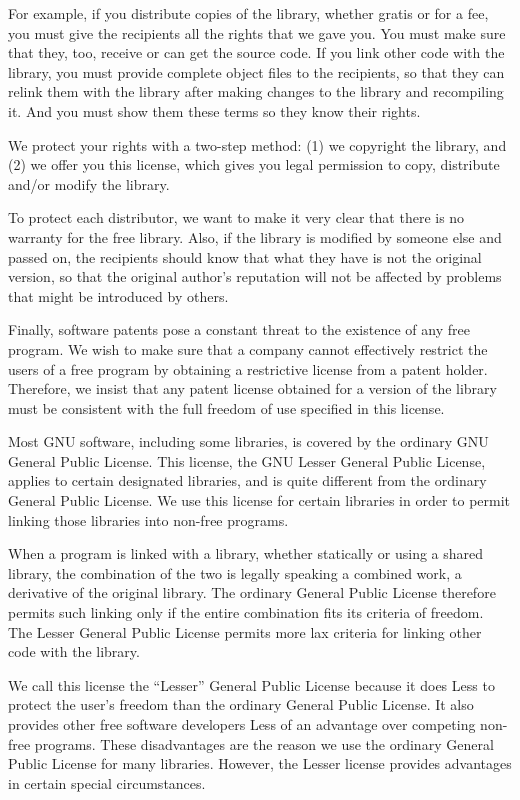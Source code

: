 \documentclass[12pt]{report}
\begin{document}
For example, if you distribute copies of the library, whether gratis or
for a fee, you must give the recipients all the rights that we gave you.
You must make sure that they, too, receive or can get the source code.  If
you link other code with the library, you must provide complete object
files to the recipients, so that they can relink them with the library
after making changes to the library and recompiling it.  And you must show
them these terms so they know their rights.

We protect your rights with a two-step method: (1) we copyright the
library, and (2) we offer you this license, which gives you legal
permission to copy, distribute and/or modify the library.

To protect each distributor, we want to make it very clear that there is
no warranty for the free library.  Also, if the library is modified by
someone else and passed on, the recipients should know that what they have
is not the original version, so that the original author's reputation will
not be affected by problems that might be introduced by others.

Finally, software patents pose a constant threat to the existence of any
free program.  We wish to make sure that a company cannot effectively
restrict the users of a free program by obtaining a restrictive license
from a patent holder.  Therefore, we insist that any patent license
obtained for a version of the library must be consistent with the full
freedom of use specified in this license.

Most GNU software, including some libraries, is covered by the ordinary
GNU General Public License.  This license, the GNU Lesser General Public
License, applies to certain designated libraries, and is quite different
from the ordinary General Public License.  We use this license for certain
libraries in order to permit linking those libraries into non-free
programs.

When a program is linked with a library, whether statically or using a
shared library, the combination of the two is legally speaking a combined
work, a derivative of the original library.  The ordinary General Public
License therefore permits such linking only if the entire combination fits
its criteria of freedom.  The Lesser General Public License permits more
lax criteria for linking other code with the library.

We call this license the ``Lesser'' General Public License because it does
Less to protect the user's freedom than the ordinary General Public
License.  It also provides other free software developers Less of an
advantage over competing non-free programs.  These disadvantages are the
reason we use the ordinary General Public License for many libraries.
However, the Lesser license provides advantages in certain special
circumstances.
\end{document}
